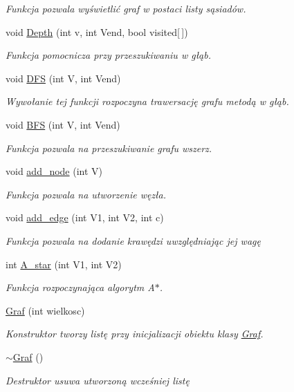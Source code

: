 \begin{DoxyCompactItemize}
\begin{DoxyCompactList}\small\item\em \-Funkcja pozwala wyświetlić graf w postaci listy sąsiadów. \end{DoxyCompactList}\item 
void \hyperlink{class_graf_a77cbab2fc81e4e020bb49df221ae11ed}{\-Depth} (int v, int \-Vend, bool visited\mbox{[}$\,$\mbox{]})
\begin{DoxyCompactList}\small\item\em \-Funkcja pomocnicza przy przeszukiwaniu w głąb. \end{DoxyCompactList}\item 
void \hyperlink{class_graf_ad33f90762984cbbb801fa2fb713291df}{\-D\-F\-S} (int \-V, int \-Vend)
\begin{DoxyCompactList}\small\item\em \-Wywołanie tej funkcji rozpoczyna trawersację grafu metodą w głąb. \end{DoxyCompactList}\item 
void \hyperlink{class_graf_aee35be636fa869476f31ce943e60c258}{\-B\-F\-S} (int \-V, int \-Vend)
\begin{DoxyCompactList}\small\item\em \-Funkcja pozwala na przeszukiwanie grafu wszerz. \end{DoxyCompactList}\item 
void \hyperlink{class_graf_afb0ee9f4563a8af2225011c8e9d54e15}{add\-\_\-node} (int \-V)
\begin{DoxyCompactList}\small\item\em \-Funkcja pozwala na utworzenie węzła. \end{DoxyCompactList}\item 
void \hyperlink{class_graf_addcfa2db3cee415f8eaf8e86059fd470}{add\-\_\-edge} (int \-V1, int \-V2, int c)
\begin{DoxyCompactList}\small\item\em \-Funkcja pozwala na dodanie krawędzi uwzględniając jej wagę \end{DoxyCompactList}\item 
int \hyperlink{class_graf_a9682ba6a2264fed3877dc9b61d94f807}{\-A\-\_\-star} (int \-V1, int \-V2)
\begin{DoxyCompactList}\small\item\em \-Funkcja rozpoczynająca algorytm \-A$\ast$. \end{DoxyCompactList}\item 
\hyperlink{class_graf_a03519ff2cdfac2ac75643ccebeb21c13}{\-Graf} (int wielkosc)
\begin{DoxyCompactList}\small\item\em \-Konstruktor tworzy listę przy inicjalizacji obiektu klasy \hyperlink{class_graf}{\-Graf}. \end{DoxyCompactList}\item 
\hyperlink{class_graf_a4ff3904fd04f367ac0219b52719c567e}{$\sim$\-Graf} ()
\begin{DoxyCompactList}\small\item\em \-Destruktor usuwa utworzoną wcześniej listę \end{DoxyCompactList}\end{DoxyCompactItemize}
